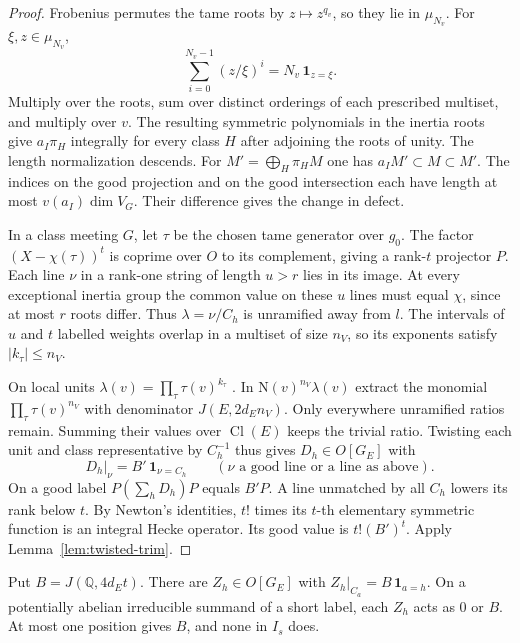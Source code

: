 \begin{proof}
Frobenius permutes the tame roots by $z\mapsto z^{q_v}$, so they lie
in $\mu_{N_v}$. For $\xi,z\in\mu_{N_v}$,
\[
 \sum_{i=0}^{N_v-1}(z/\xi)^i=N_v\,\mathbf1_{z=\xi}.
\]
Multiply over the roots, sum over distinct orderings of each prescribed
multiset, and multiply over $v$. The resulting symmetric polynomials
in the inertia roots give $a_I\pi_H$ integrally for every class $H$
after adjoining the roots of unity. The length normalization descends.
For $M'=\bigoplus_H\pi_HM$ one has $a_I M'\subset M\subset M'$.
The indices on the good projection and on the good intersection
each have length at most $v(a_I)\dim V_G$. Their difference gives the
change in defect.

In a class meeting $G$, let $\tau$ be the chosen tame generator over
$g_0$. The factor $(X-\chi(\tau))^t$ is coprime over $O$ to its
complement, giving a rank-$t$ projector $P$. Each line $\nu$ in a
rank-one string of length $u>r$ lies in its image. At every exceptional
inertia group the common value on these $u$ lines must equal $\chi$,
since at most $r$ roots differ. Thus $\lambda=\nu/C_h$ is unramified
away from $l$. The intervals of $u$ and $t$ labelled weights overlap
in a multiset of size $n_V$, so its exponents satisfy $|k_\tau|\le n_V$.

On local units $\lambda(v)=\prod_\tau\tau(v)^{k_\tau}$
\citep[Proposition~B.4]{conrad-local-characters}. In
$\mathrm N(v)^{n_V}\lambda(v)$ extract the monomial
$\prod_\tau\tau(v)^{n_V}$ with denominator $J(E,2d_E n_V)$.
Only everywhere unramified ratios remain. Summing their values over
$\operatorname{Cl}(E)$ keeps the trivial ratio. Twisting each unit
and class representative by $C_h^{-1}$ thus gives $D_h\in O[G_E]$
with
\[
 D_h|_\nu=B'\,\mathbf1_{\nu=C_h}
 \qquad(\nu\text{ a good line or a line as above}).
\]
On a good label $P(\sum_h D_h)P$ equals $B'P$. A line unmatched
by all $C_h$ lowers its rank below $t$. By Newton's identities,
$t!$ times its $t$-th elementary symmetric function is an integral
Hecke operator. Its good value is $t!(B')^t$. Apply
Lemma~\ref{lem:twisted-trim}.
\end{proof}

\begin{twistedtest}\label{lem:twisted-position}
Put $B=J(\mathbb Q,4d_Et)$. There are $Z_h\in O[G_E]$ with
$Z_h|_{C_a}=B\,\mathbf1_{a=h}$. On a potentially abelian irreducible
summand of a short label, each $Z_h$ acts as $0$ or $B$.
At most one position gives $B$, and none in $I_s$ does.
\end{twistedtest}

